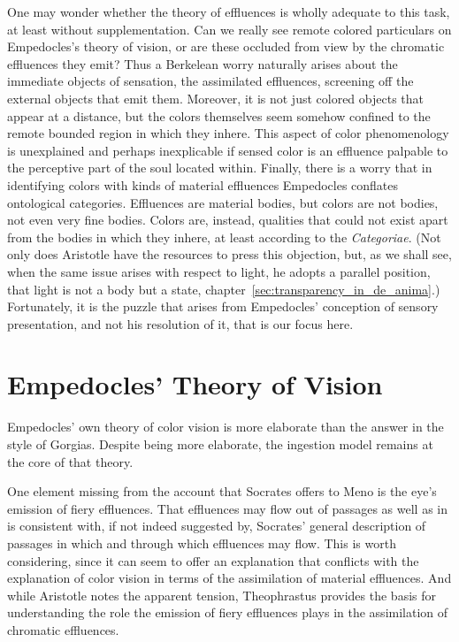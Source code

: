 One may wonder whether the theory of effluences is wholly adequate to this task, at least without supplementation. Can we really see remote colored particulars on Empedocles's theory of vision, or are these occluded from view by the chromatic effluences they emit? Thus a Berkelean worry naturally arises about the immediate objects of sensation, the assimilated effluences, screening off the external objects that emit them. Moreover, it is not just colored objects that appear at a distance, but the colors themselves seem somehow confined to the remote bounded region in which they inhere. This aspect of color phenomenology is unexplained and perhaps inexplicable if sensed color is an effluence palpable to the perceptive part of the soul located within. Finally, there is a worry that in identifying colors with kinds of material effluences Empedocles conflates ontological categories. Effluences are material bodies, but colors are not bodies, not even very fine bodies. Colors are, instead, qualities that could not exist apart from the bodies in which they inhere, at least according to the \emph{Categoriae}. (Not only does Aristotle have the resources to press this objection, but, as we shall see, when the same issue arises with respect to light, he adopts a parallel position, that light is not a body but a state, chapter~\ref{sec:transparency_in_de_anima}.) Fortunately, it is the puzzle that arises from Empedocles' conception of sensory presentation, and not his resolution of it, that is our focus here. 


\section{Empedocles' Theory of Vision} %
\label{sec:empedocles_theory_of_vision}

Empedocles' own theory of color vision is more elaborate than the answer in the style of Gorgias. Despite being more elaborate, the ingestion model remains at the core of that theory. 

One element missing from the account that Socrates offers to Meno is the eye's emission of fiery effluences. That effluences may flow out of passages as well as in is consistent with, if not indeed suggested by, Socrates' general description of passages in which and through which effluences may flow. This is worth considering, since it can seem to offer an explanation that conflicts with the explanation of color vision in terms of the assimilation of material effluences. And while Aristotle notes the apparent tension, Theophrastus provides the basis for understanding the role the emission of fiery effluences plays in the assimilation of chromatic effluences.

